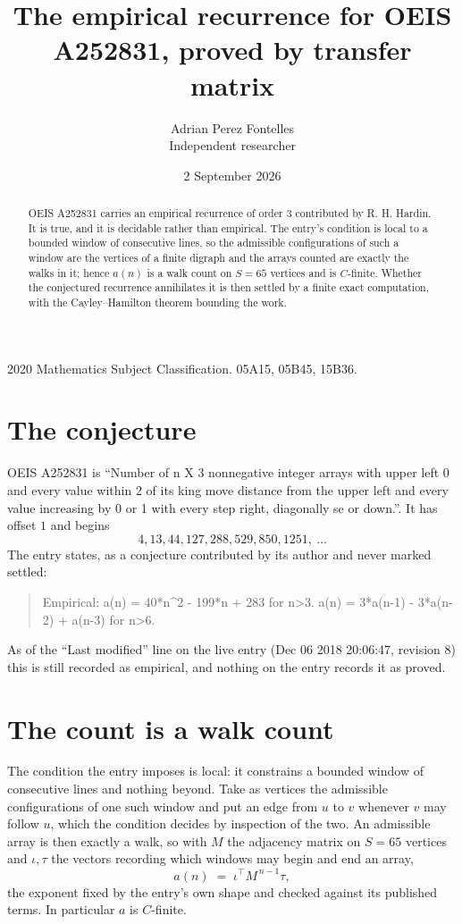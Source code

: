 \documentclass[11pt,a4paper]{article}
\title{The empirical recurrence for OEIS A252831, proved by transfer matrix}
\author{Adrian Perez Fontelles\\ \small Independent researcher}
\date{2 September 2026}
\theoremstyle{plain}
\theoremstyle{definition}
\begin{document}
\maketitle

\begin{abstract}
OEIS A252831 carries an empirical recurrence of order $3$ contributed by R. H. Hardin. It is
true, and it is decidable rather than empirical. The entry's condition is local to a bounded window of consecutive lines, so
the admissible configurations of such a window are the vertices of a finite digraph and the
arrays counted are exactly the walks in it; hence $a(n)$ is a walk count on $S=65$ vertices
and is $C$-finite. Whether the conjectured recurrence annihilates it is then settled by a
finite exact computation, with the Cayley--Hamilton theorem bounding the work.
\end{abstract}

\noindent\small 2020 Mathematics Subject Classification. 05A15, 05B45, 15B36.\normalsize

\section{The conjecture}

OEIS A252831 is ``Number of n X 3 nonnegative integer arrays with upper left 0 and every value within 2 of its king move distance from the upper left and every value increasing by 0 or 1 with every step right, diagonally se or down.''. It has offset $1$ and begins
\[
4, 13, 44, 127, 288, 529, 850, 1251,\ \dots
\]
The entry states, as a conjecture contributed by its author and never marked settled:
\begin{quote}
Empirical: a(n) = 40*n\^{}2 - 199*n + 283 for n>3. a(n) = 3*a(n-1) - 3*a(n-2) + a(n-3) for n>6.
\end{quote}
As of the ``Last modified'' line on the live entry (Dec 06 2018 20:06:47, revision 8) this is still
recorded as empirical, and nothing on the entry records it as proved.

\section{The count is a walk count}

The condition the entry imposes is local: it constrains a bounded window of consecutive lines and nothing beyond. Take as
vertices the admissible configurations of one such window and put an edge from $u$ to $v$
whenever $v$ may follow $u$, which the condition decides by inspection of the two. An
admissible array is then exactly a walk, so with $M$ the adjacency matrix on $S=65$ vertices
and $\iota,\tau$ the vectors recording which windows may begin and end an array,
\[
a(n)\;=\;\iota^{\!\top}M^{\,n-1}\tau ,
\]
the exponent fixed by the entry's own shape and checked against its published terms. In
particular $a$ is $C$-finite.
\end{document}
